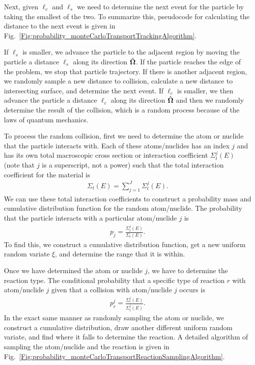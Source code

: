 Next, given $\ell_c$ and $\ell_s$ we need to determine the next event for the particle by taking the smallest of the two. To summarize this, pseudocode for calculating the distance to the next event is given in Fig.~\ref{Fig:probability_monteCarloTransportTrackingAlgorithm}.

If $\ell_s$ is smaller, we advance the particle to the adjacent region by moving the particle a distance $\ell_s$ along its direction $\hat{\mathbf{\Omega}}$. If the particle reaches the edge of the problem, we stop that particle trajectory. If there is another adjacent region, we randomly sample a new distance to collision, calculate a new distance to intersecting surface, and determine the next event. If $\ell_c$ is smaller, we then advance the particle a distance $\ell_c$ along its direction $\hat{\mathbf{\Omega}}$ and then we randomly determine the result of the collision, which is a random process because of the laws of quantum mechanics.

To process the random collision, first we need to determine the atom or nuclide that the particle interacts with. Each of these atoms/nuclides has an index $j$ and has its own total macroscopic cross section or interaction coefficient $\Sigma_t^j(E)$ (note that $j$ is a superscript, not a power) such that the total interaction coefficient for the material is
\begin{align}
  \Sigma_t(E) = \sum_{j=1}^J \Sigma_t^j(E) .
\end{align}
We can use these total interaction coefficients to construct a probability mass and cumulative distribution function for the random atom/nuclide. The probability that the particle interacts with a particular atom/nuclide $j$ is
\begin{align}
  p_j = \frac{ \Sigma_t^j(E) }{ \Sigma_t(E) } .
\end{align}
To find this, we construct a cumulative distribution function, get a new uniform random variate $\xi$, and determine the range that it is within.

Once we have determined the atom or nuclide $j$, we have to determine the reaction type. The conditional probability that a specific type of reaction $r$ with atom/nuclide $j$ given that a collision with atom/nuclide $j$ occurs is
\begin{align}
  p_r^j = \frac{ \Sigma_r^j(E) }{ \Sigma_t^j(E) } .
\end{align}
In the exact same manner as randomly sampling the atom or nuclide, we construct a cumulative distribution, draw another different uniform random variate, and find where it falls to determine the reaction. A detailed algorithm of sampling the atom/nuclide and the reaction is given in Fig.~\ref{Fig:probability_monteCarloTransportReactionSamplingAlgorithm}.


